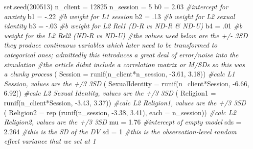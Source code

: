 \documentclass[
  11pt,
]{book}
\newenvironment{Shaded}{\begin{snugshade}}{\end{snugshade}}
\newcommand{\AttributeTok}[1]{\textcolor[rgb]{0.77,0.63,0.00}{#1}}
\newcommand{\CommentTok}[1]{\textcolor[rgb]{0.56,0.35,0.01}{\textit{#1}}}
\newcommand{\DecValTok}[1]{\textcolor[rgb]{0.00,0.00,0.81}{#1}}
\newcommand{\FloatTok}[1]{\textcolor[rgb]{0.00,0.00,0.81}{#1}}
\newcommand{\FunctionTok}[1]{\textcolor[rgb]{0.00,0.00,0.00}{#1}}
\newcommand{\NormalTok}[1]{#1}
\newcommand{\OtherTok}[1]{\textcolor[rgb]{0.56,0.35,0.01}{#1}}
\newcommand{\SpecialCharTok}[1]{\textcolor[rgb]{0.00,0.00,0.00}{#1}}
\begin{document}
\begin{Shaded}
\begin{Highlighting}[]
\FunctionTok{set.seed}\NormalTok{(}\DecValTok{200513}\NormalTok{)}
\NormalTok{n\_client }\OtherTok{=} \DecValTok{12825}
\NormalTok{n\_session }\OtherTok{=} \DecValTok{5}
\NormalTok{b0 }\OtherTok{=} \FloatTok{2.03} \CommentTok{\#intercept for anxiety}
\NormalTok{b1 }\OtherTok{=} \SpecialCharTok{{-}}\NormalTok{.}\DecValTok{22} \CommentTok{\#b weight for L1 session}
\NormalTok{b2 }\OtherTok{=}\NormalTok{ .}\DecValTok{13} \CommentTok{\#b weight for L2 sexual identity}
\NormalTok{b3 }\OtherTok{=}  \SpecialCharTok{{-}}\NormalTok{.}\DecValTok{03} \CommentTok{\#b weight for L2 Rel1 (D{-}R vs ND{-}R \& ND{-}U)}
\NormalTok{b4 }\OtherTok{=}\NormalTok{ .}\DecValTok{01} \CommentTok{\#b weight for the L2 Rel2 (ND{-}R vs ND{-}U)}
\CommentTok{\#the values used below are the +/{-} 3SD they produce continuous variables which later need to be transformed to categorical ones; admittedly this introduces a great deal of error/noise into the simulation}
\CommentTok{\#the article didn\textquotesingle{}t include a correlation matrix or M/SDs so this was a clunky process }
\NormalTok{( }\AttributeTok{Session =} \FunctionTok{runif}\NormalTok{(n\_client}\SpecialCharTok{*}\NormalTok{n\_session, }\SpecialCharTok{{-}}\FloatTok{3.61}\NormalTok{, }\FloatTok{3.18}\NormalTok{)) }\CommentTok{\#calc L1 Session, values are the +/3 3SD}
\NormalTok{( }\AttributeTok{SexualIdentity =} \FunctionTok{runif}\NormalTok{(n\_client}\SpecialCharTok{*}\NormalTok{Session, }\SpecialCharTok{{-}}\FloatTok{6.66}\NormalTok{, }\FloatTok{6.92}\NormalTok{)) }\CommentTok{\#calc L2 Sexual Identity, values are the +/3 3SD}
\NormalTok{( }\AttributeTok{Religion1 =} \FunctionTok{runif}\NormalTok{(n\_client}\SpecialCharTok{*}\NormalTok{Session, }\SpecialCharTok{{-}}\FloatTok{3.43}\NormalTok{, }\FloatTok{3.37}\NormalTok{)) }\CommentTok{\#calc L2 Religion1, values are the +/3 3SD}
\NormalTok{( }\AttributeTok{Religion2 =} \FunctionTok{rep}\NormalTok{ (}\FunctionTok{runif}\NormalTok{(n\_session, }\SpecialCharTok{{-}}\FloatTok{3.38}\NormalTok{, }\FloatTok{3.41}\NormalTok{), }\AttributeTok{each =}\NormalTok{ n\_session)) }\CommentTok{\#calc L2 Religion2, values are the +/3 3SD}
\NormalTok{mu }\OtherTok{=} \FloatTok{1.76} \CommentTok{\#intercept of empty model }
\NormalTok{sds }\OtherTok{=} \FloatTok{2.264} \CommentTok{\#this is the SD of the DV}
\NormalTok{sd }\OtherTok{=} \DecValTok{1} \CommentTok{\#this is the observation{-}level random effect variance that we set at 1}


\end{Highlighting}
\end{Shaded}
\end{document}
